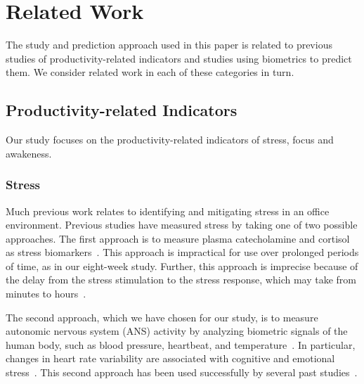 \section{Related Work}

The study and prediction approach used in this paper is related
to previous studies of productivity-related indicators and studies
using biometrics to predict them. We consider
related work in each of these categories in turn.

\subsection{Productivity-related Indicators}

Our study focuses on the productivity-related indicators of stress, focus and awakeness.



\subsubsection{Stress}
Much previous work relates to identifying and mitigating stress in an office environment.
Previous studies have measured stress by taking one of two possible approaches.
The first approach is to measure plasma catecholamine and cortisol as stress biomarkers~\cite{piazza10}.
This approach is impractical for use over prolonged periods of time, as in our eight-week study.
Further, this approach is imprecise because of the delay from the stress stimulation to the stress response, which 
may take from minutes to hours~\cite{Chandola10,Hellhammer09}.

The second approach, which we have chosen for our study, is to measure autonomic nervous system (ANS) activity by analyzing biometric signals of the human body, such as blood pressure, heartbeat, and temperature~\cite{kataoka00,Eekelen04,valentini10}.
In particular, changes in heart rate variability are associated with cognitive and emotional stress~\cite{mcduff16,dishman2000stress}.
This second approach has been used successfully by several past studies~\cite{Force96,gal07,montano09}.

